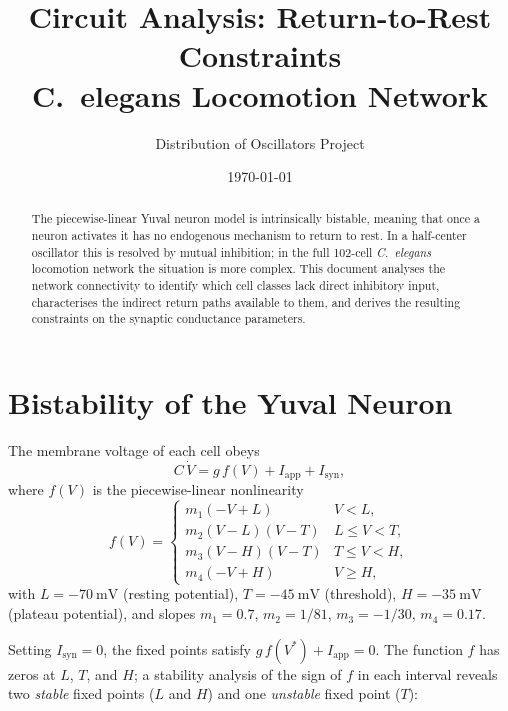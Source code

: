 \documentclass[11pt]{article}
\title{Circuit Analysis: Return-to-Rest Constraints\\
\large C.\ elegans Locomotion Network}
\author{Distribution of Oscillators Project}
\date{\today}
\begin{document}
\maketitle

\begin{abstract}
The piecewise-linear Yuval neuron model is intrinsically bistable, meaning that once a neuron
activates it has no endogenous mechanism to return to rest.  In a half-center oscillator this is
resolved by mutual inhibition; in the full 102-cell \textit{C.~elegans} locomotion network the
situation is more complex.  This document analyses the network connectivity to identify which cell
classes lack direct inhibitory input, characterises the indirect return paths available to them,
and derives the resulting constraints on the synaptic conductance parameters.
\end{abstract}

\section{Bistability of the Yuval Neuron}

The membrane voltage of each cell obeys
\begin{equation}
    C\,\dot{V} = g\,f(V) + I_{\mathrm{app}} + I_{\mathrm{syn}},
\end{equation}
where $f(V)$ is the piecewise-linear nonlinearity
\begin{equation}
    f(V) =
    \begin{cases}
        m_1(-V + L)             & V < L,\\
        m_2(V - L)(V - T)       & L \le V < T,\\
        m_3(V - H)(V - T)       & T \le V < H,\\
        m_4(-V + H)             & V \ge H,
    \end{cases}
\end{equation}
with $L = -70\ \mathrm{mV}$ (resting potential), $T = -45\ \mathrm{mV}$ (threshold),
$H = -35\ \mathrm{mV}$ (plateau potential), and slopes $m_1 = 0.7$, $m_2 = 1/81$,
$m_3 = -1/30$, $m_4 = 0.17$.

Setting $I_{\mathrm{syn}} = 0$, the fixed points satisfy $g\,f(V^*) + I_{\mathrm{app}} = 0$.
The function $f$ has zeros at $L$, $T$, and $H$; a stability analysis of the sign of $f$ in each
interval reveals two \emph{stable} fixed points ($L$ and $H$) and one \emph{unstable} fixed point
($T$):
\end{document}
